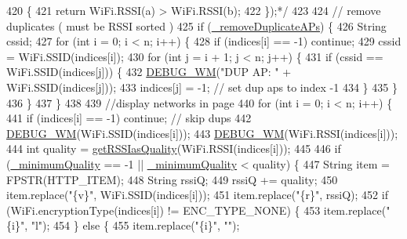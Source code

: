 \begin{DoxyCode}
420 \textcolor{comment}{        \{}
421 \textcolor{comment}{        return WiFi.RSSI(a) > WiFi.RSSI(b);}
422 \textcolor{comment}{        \});*/}
423 
424       \textcolor{comment}{// remove duplicates ( must be RSSI sorted )}
425       \textcolor{keywordflow}{if} (\hyperlink{class_wi_fi_manager_a94d25bd8d02bbf0236d75dfd8ee682d7}{\_removeDuplicateAPs}) \{
426         String cssid;
427         \textcolor{keywordflow}{for} (\textcolor{keywordtype}{int} i = 0; i < n; i++) \{
428           \textcolor{keywordflow}{if} (indices[i] == -1) \textcolor{keywordflow}{continue};
429           cssid = WiFi.SSID(indices[i]);
430           \textcolor{keywordflow}{for} (\textcolor{keywordtype}{int} j = i + 1; j < n; j++) \{
431             \textcolor{keywordflow}{if} (cssid == WiFi.SSID(indices[j])) \{
432               \hyperlink{class_wi_fi_manager_ae5f595c670ccbcf9a191baf50f5c7c26}{DEBUG\_WM}(\textcolor{stringliteral}{"DUP AP: "} + WiFi.SSID(indices[j]));
433               indices[j] = -1; \textcolor{comment}{// set dup aps to index -1}
434             \}
435           \}
436         \}
437       \}
438 
439       \textcolor{comment}{//display networks in page}
440       \textcolor{keywordflow}{for} (\textcolor{keywordtype}{int} i = 0; i < n; i++) \{
441         \textcolor{keywordflow}{if} (indices[i] == -1) \textcolor{keywordflow}{continue}; \textcolor{comment}{// skip dups}
442         \hyperlink{class_wi_fi_manager_ae5f595c670ccbcf9a191baf50f5c7c26}{DEBUG\_WM}(WiFi.SSID(indices[i]));
443         \hyperlink{class_wi_fi_manager_ae5f595c670ccbcf9a191baf50f5c7c26}{DEBUG\_WM}(WiFi.RSSI(indices[i]));
444         \textcolor{keywordtype}{int} quality = \hyperlink{class_wi_fi_manager_ae71cfd6bd70ada2ca02e1d20b152d0e5}{getRSSIasQuality}(WiFi.RSSI(indices[i]));
445 
446         \textcolor{keywordflow}{if} (\hyperlink{class_wi_fi_manager_ad1e130a5ce502767de764ea0cb1cecf6}{\_minimumQuality} == -1 || \hyperlink{class_wi_fi_manager_ad1e130a5ce502767de764ea0cb1cecf6}{\_minimumQuality} < quality) \{
447           String item = FPSTR(HTTP\_ITEM);
448           String rssiQ;
449           rssiQ += quality;
450           item.replace(\textcolor{stringliteral}{"\{v\}"}, WiFi.SSID(indices[i]));
451           item.replace(\textcolor{stringliteral}{"\{r\}"}, rssiQ);
452           \textcolor{keywordflow}{if} (WiFi.encryptionType(indices[i]) != ENC\_TYPE\_NONE) \{
453             item.replace(\textcolor{stringliteral}{"\{i\}"}, \textcolor{stringliteral}{"l"});
454           \} \textcolor{keywordflow}{else} \{
455             item.replace(\textcolor{stringliteral}{"\{i\}"}, \textcolor{stringliteral}{""});

\end{DoxyCode}
